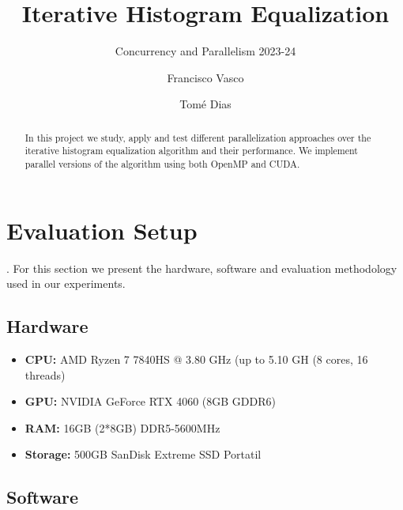 \documentclass[sigconf]{acmart}
\begin{document}
    \lstset{language=bash}
    \title{Iterative Histogram Equalization}
    \subtitle{Concurrency and Parallelism 2023-24}



    \author{Francisco Vasco}

    \author{Tomé Dias}


    \begin{abstract}
        In this project we study, apply and test different parallelization approaches over the iterative histogram equalization algorithm and their performance.
        We implement parallel versions of the algorithm using both OpenMP and CUDA.
    \end{abstract}


    \maketitle

    \section{Evaluation Setup}.
    For this section we present the hardware, software and evaluation methodology used in our experiments.

    \subsection{Hardware}

    \begin{itemize}
        \item \textbf{CPU:} AMD Ryzen 7 7840HS @ 3.80 GHz (up to 5.10 GH (8 cores, 16 threads)
        \item \textbf{GPU:} NVIDIA GeForce RTX 4060 (8GB GDDR6)
        \item \textbf{RAM:} 16GB (2*8GB) DDR5-5600MHz
        \item \textbf{Storage:} 500GB SanDisk Extreme SSD Portatil
    \end{itemize}

    \subsection{Software}
\end{document}
